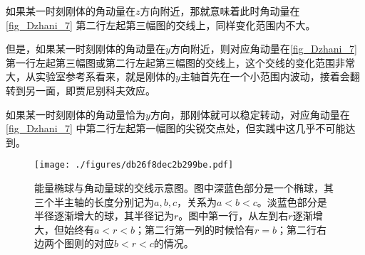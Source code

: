 如果某一时刻刚体的角动量在$z$方向附近，那就意味着此时角动量在\autoref{fig_Dzhani_7} 第二行左起第三幅图的交线上，同样变化范围内不大。

但是，如果某一时刻刚体的角动量在$y$方向附近，则对应角动量在\autoref{fig_Dzhani_7} 第一行左起第三幅图或第二行左起第三幅图的交线上，这个交线的变化范围非常大，从实验室参考系看来，就是刚体的$y$主轴首先在一个小范围内波动，接着会翻转到另一面，即贾尼别科夫效应。

如果某一时刻刚体的角动量恰为$y$方向，那刚体就可以稳定转动，对应角动量在\autoref{fig_Dzhani_7} 中第二行左起第一幅图的尖锐交点处，但实践中这几乎不可能达到。




\begin{figure}[ht]
\centering
\texttt{[image: ./figures/db26f8dec2b299be.pdf]}
\caption{能量椭球与角动量球的交线示意图。图中深蓝色部分是一个椭球，其三个半主轴的长度分别记为$a, b, c$，关系为$a<b<c$。淡蓝色部分是半径逐渐增大的球，其半径记为$r$。图中第一行，从左到右$r$逐渐增大，但始终有$a<r<b$；第二行第一列的时候恰有$r=b$；第二行右边两个图则的对应$b<r<c$的情况。} \label{fig_Dzhani_7}
\end{figure}









